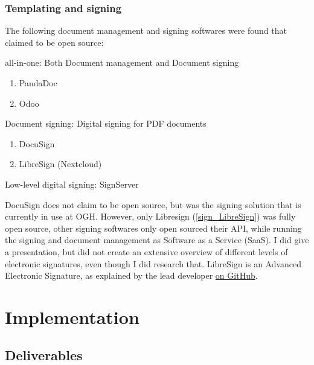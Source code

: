 \documentclass[journal, dvipsnames]{IEEEtran}
\begin{document}
\subsubsection{Templating and signing}
The following document management and signing softwares were found that claimed to be open source:
\begin{LaTeXdescription}
  \item[all-in-one:] Both Document management and Document signing
  \begin{enumerate}
    \item PandaDoc
    \item Odoo
  \end{enumerate}
  \item[Document signing:] Digital signing for PDF documents
  \begin{enumerate}
    \item DocuSign
    \item LibreSign (Nextcloud)\label{sign_LibreSign}
  \end{enumerate}
  \item[Low-level digital signing:] SignServer
\end{LaTeXdescription}
DocuSign does not claim to be open source, but was the signing solution that is currently in use at OGH.
However, only Libresign (\ref{sign_LibreSign}) was fully open source, other signing softwares only open sourced their API, while running the signing and document management as Software as a Service (SaaS). I did give a presentation, but did not create an extensive overview of different levels of electronic signatures, even though I did research that. LibreSign is an Advanced Electronic Signature, as explained by the lead developer \href{https://github.com/LibreSign/libresign/issues/1788#issuecomment-1638228780}{on GitHub}.

\section{Implementation}\label{sec_implementation}

\subsection{Deliverables}
\end{document}
